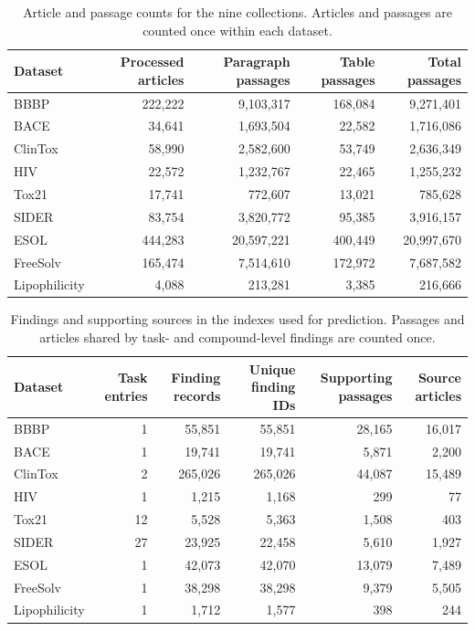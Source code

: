 \begin{table}[t]
\centering
\small
\begin{tabular}{lrrrr}
\toprule
\textbf{Dataset} & \textbf{Processed articles} & \textbf{Paragraph passages} & \textbf{Table passages} & \textbf{Total passages} \\
\midrule
BBBP          & 222,222 & 9,103,317 & 168,084 & 9,271,401 \\
BACE          & 34,641 & 1,693,504 & 22,582 & 1,716,086 \\
ClinTox       & 58,990 & 2,582,600 & 53,749 & 2,636,349 \\
HIV           & 22,572 & 1,232,767 & 22,465 & 1,255,232 \\
Tox21         & 17,741 & 772,607 & 13,021 & 785,628 \\
SIDER         & 83,754 & 3,820,772 & 95,385 & 3,916,157 \\
ESOL          & 444,283 & 20,597,221 & 400,449 & 20,997,670 \\
FreeSolv      & 165,474 & 7,514,610 & 172,972 & 7,687,582 \\
Lipophilicity & 4,088 & 213,281 & 3,385 & 216,666 \\
\bottomrule
\end{tabular}
\caption{Article and passage counts for the nine collections. Articles and passages are counted once within each dataset.}
\label{tab:corpus-construction}
\end{table}

\begin{table}[t]
\centering
\small
\begin{tabular}{lrrrrr}
\toprule
\textbf{Dataset} & \textbf{Task entries} & \textbf{Finding records} & \textbf{Unique finding IDs} & \textbf{Supporting passages} & \textbf{Source articles} \\
\midrule
BBBP          & 1 & 55,851 & 55,851 & 28,165 & 16,017 \\
BACE          & 1 & 19,741 & 19,741 & 5,871 & 2,200 \\
ClinTox       & 2 & 265,026 & 265,026 & 44,087 & 15,489 \\
HIV           & 1 & 1,215 & 1,168 & 299 & 77 \\
Tox21         & 12 & 5,528 & 5,363 & 1,508 & 403 \\
SIDER         & 27 & 23,925 & 22,458 & 5,610 & 1,927 \\
ESOL          & 1 & 42,073 & 42,070 & 13,079 & 7,489 \\
FreeSolv      & 1 & 38,298 & 38,298 & 9,379 & 5,505 \\
Lipophilicity & 1 & 1,712 & 1,577 & 398 & 244 \\
\bottomrule
\end{tabular}
\caption{Findings and supporting sources in the indexes used for prediction. Passages and articles shared by task- and compound-level findings are counted once.}
\label{tab:corpus-index}
\end{table}

